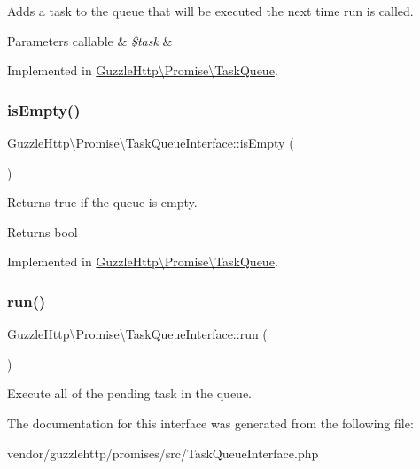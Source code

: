 Adds a task to the queue that will be executed the next time run is called.


\begin{DoxyParams}[1]{Parameters}
callable & {\em \$task} & \\
\hline
\end{DoxyParams}


Implemented in \hyperlink{classGuzzleHttp_1_1Promise_1_1TaskQueue_a6f14a0f54a9033aabd6e49b20e3749b3}{Guzzle\+Http\textbackslash{}\+Promise\textbackslash{}\+Task\+Queue}.

\mbox{\label{interfaceGuzzleHttp_1_1Promise_1_1TaskQueueInterface_ac979f0b2e52a8ef6d9fc3cc751873d7b}} 
\subsubsection{\texorpdfstring{is\+Empty()}{isEmpty()}}
{\footnotesize\ttfamily Guzzle\+Http\textbackslash{}\+Promise\textbackslash{}\+Task\+Queue\+Interface\+::is\+Empty (\begin{DoxyParamCaption}{ }\end{DoxyParamCaption})}

Returns true if the queue is empty.

\begin{DoxyReturn}{Returns}
bool 
\end{DoxyReturn}


Implemented in \hyperlink{classGuzzleHttp_1_1Promise_1_1TaskQueue_a4589829e74091b66d7b6aba06e6d38b8}{Guzzle\+Http\textbackslash{}\+Promise\textbackslash{}\+Task\+Queue}.

\mbox{\label{interfaceGuzzleHttp_1_1Promise_1_1TaskQueueInterface_a237b20becf9d317b6092a8bc04ab27fc}} 
\subsubsection{\texorpdfstring{run()}{run()}}
{\footnotesize\ttfamily Guzzle\+Http\textbackslash{}\+Promise\textbackslash{}\+Task\+Queue\+Interface\+::run (\begin{DoxyParamCaption}{ }\end{DoxyParamCaption})}

Execute all of the pending task in the queue. 

The documentation for this interface was generated from the following file\+:\begin{DoxyCompactItemize}
\item 
vendor/guzzlehttp/promises/src/Task\+Queue\+Interface.\+php\end{DoxyCompactItemize}
